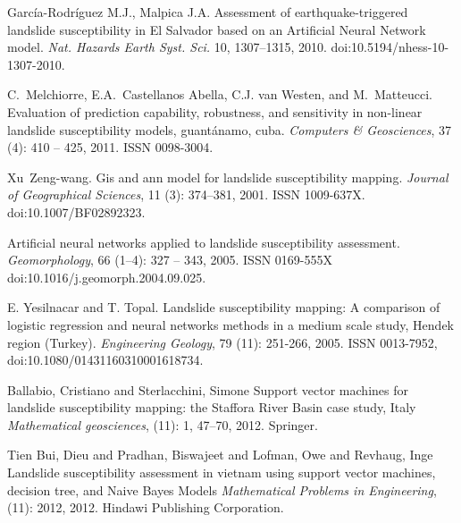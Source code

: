 \documentclass[11pt,twoside]{rmta2010eng}%
\begin{document}
\begin{thebibliography}{99}
Garc\'{i}a-Rodr\'{i}guez M.J., Malpica J.A.
\newblock Assessment of earthquake-triggered landslide susceptibility in El Salvador based on an Artificial Neural Network model.
\newblock \emph{Nat. Hazards Earth Syst. Sci.}
 10, 1307–1315, 2010. 
\newblock doi:10.5194/nhess-10-1307-2010.
  

C.~Melchiorre, E.A.~Castellanos Abella, C.J. van Westen, and M.~Matteucci.
\newblock Evaluation of prediction capability, robustness, and sensitivity in
  non-linear landslide susceptibility models, guant\'{a}namo, cuba.
\newblock \emph{Computers {\&} Geosciences}, 37 (4): 410 --
  425, 2011.
\newblock ISSN 0098-3004.


Xu~Zeng-wang.
\newblock Gis and ann model for landslide susceptibility mapping.
\newblock \emph{Journal of Geographical Sciences}, 11 (3):
  374--381, 2001.
\newblock ISSN 1009-637X.
\newblock doi:{10.1007/BF02892323}.


Artificial neural networks applied to landslide susceptibility assessment.
\newblock \emph{Geomorphology}, 66 (1–4): 327 -- 343, 2005.
\newblock ISSN 0169-555X
\newblock doi:10.1016/j.geomorph.2004.09.025.



E. Yesilnacar and T. Topal.
\newblock Landslide susceptibility mapping: A comparison of logistic regression and neural networks methods in a medium scale study, Hendek region (Turkey).
\newblock \emph{Engineering Geology}, 79
  (11): 251-266, 2005.
\newblock ISSN 0013-7952,
\newblock doi:10.1080/01431160310001618734.




Ballabio, Cristiano and Sterlacchini, Simone
\newblock Support vector machines for landslide susceptibility mapping: the Staffora River Basin case study, Italy
\newblock \emph{Mathematical geosciences},
  (11): 1, 47--70, 2012.
\newblock Springer. 



Tien Bui, Dieu and Pradhan, Biswajeet and Lofman, Owe and Revhaug, Inge
\newblock Landslide susceptibility assessment in vietnam using support vector machines, decision tree, and Naive Bayes Models
\newblock \emph{Mathematical Problems in Engineering},
  (11): 2012, 2012.
\newblock Hindawi Publishing Corporation.





\end{thebibliography}
\end{document}
